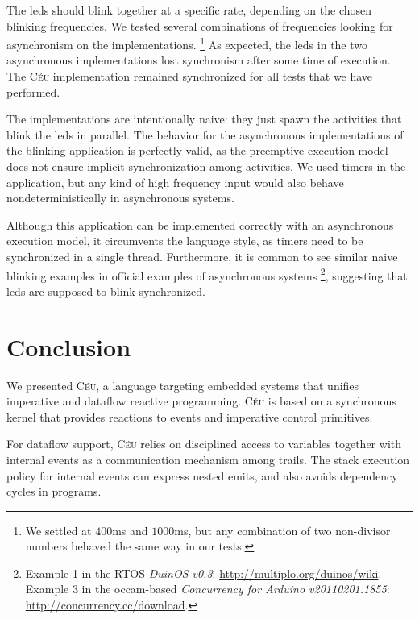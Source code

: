 \documentclass{sigplan-proc}
\newcommand{\2}{\;\;}
\newcommand{\5}{\;\;\;\;\;}
\newcommand{\CEU}{\textsc{C\'{e}u}}
\begin{document}
The leds should blink together at a specific rate, depending on the chosen 
blinking frequencies.
We tested several combinations of frequencies looking for asynchronism on the 
implementations.%
\footnote{We settled at $400$ms and $1000$ms, but any combination of two 
non-divisor numbers behaved the same way in our tests.}
As expected, the leds in the two asynchronous implementations lost synchronism 
after some time of execution.
The \CEU{} implementation remained synchronized for all tests that we have 
performed.

The implementations are intentionally naive: they just spawn the activities 
that blink the leds in parallel.
The behavior for the asynchronous implementations of the blinking application 
is perfectly valid, as the preemptive execution model does not ensure implicit 
synchronization among activities.
We used timers in the application, but any kind of high frequency input would 
also behave nondeterministically in asynchronous systems.

Although this application can be implemented correctly with an asynchronous 
execution model, it circumvents the language style, as timers need to be 
synchronized in a single thread.
Furthermore, it is common to see similar naive blinking examples in official 
examples of asynchronous systems%
\footnote{
Example 1 in the RTOS \emph{DuinOS v0.3}:
\url{http://multiplo.org/duinos/wiki}.\\
Example 3 in the occam-based \emph{Concurrency for Arduino v20110201.1855}:
\url{http://concurrency.cc/download}.
}, suggesting that leds are supposed to blink synchronized.


\section{Conclusion}
\label{sec:conclusion}

We presented \CEU, a language targeting embedded systems that unifies 
imperative and dataflow reactive programming.
\CEU{} is based on a synchronous kernel that provides reactions to events and 
imperative control primitives.

For dataflow support, \CEU{} relies on disciplined access to variables together 
with internal events as a communication mechanism among trails.
The stack execution policy for internal events can express nested emits, and 
also avoids dependency cycles in programs.
\end{document}
